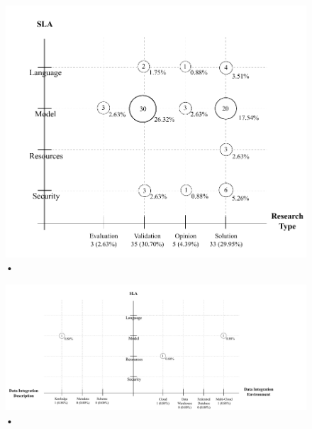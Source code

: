 \begin{figure}[hbtp]
\caption{•}
\centering
\includegraphics[scale=0.7]{figs/bubble-charts/SLA-ResearchType.pdf}
\end{figure}

\begin{figure}[hbtp]
\caption{•}
\centering
\includegraphics[scale=0.5]{figs/bubble-charts/SLA-DIEnvironment-DI-Description.pdf}
\end{figure}

